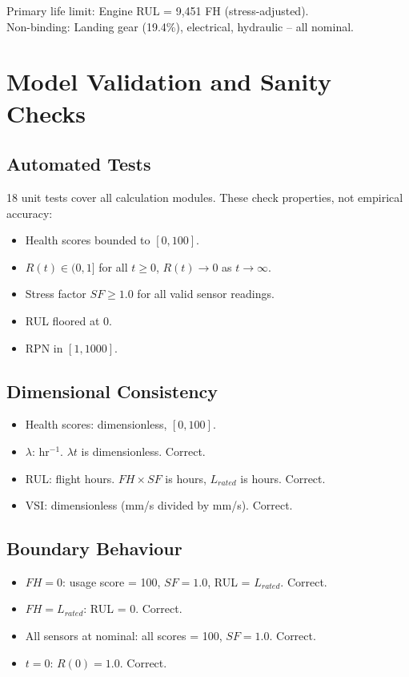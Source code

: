 \documentclass[11pt, a4paper]{report}
\begin{document}
\medskip
\noindent Primary life limit: Engine RUL = 9,451 FH (stress-adjusted). \\
Non-binding: Landing gear (19.4\%), electrical, hydraulic -- all nominal.

\chapter{Model Validation and Sanity Checks}

\section{Automated Tests}

18 unit tests cover all calculation modules. These check properties, not
empirical accuracy:

\begin{itemize}
  \item Health scores bounded to $[0, 100]$.
  \item $R(t) \in (0, 1]$ for all $t \geq 0$, $R(t) \to 0$ as $t \to \infty$.
  \item Stress factor $SF \geq 1.0$ for all valid sensor readings.
  \item RUL floored at 0.
  \item RPN in $[1, 1000]$.
\end{itemize}

\section{Dimensional Consistency}

\begin{itemize}
  \item Health scores: dimensionless, $[0, 100]$.
  \item $\lambda$: hr$^{-1}$. $\lambda t$ is dimensionless. Correct.
  \item RUL: flight hours. $FH \times SF$ is hours, $L_{rated}$ is hours. Correct.
  \item VSI: dimensionless (mm/s divided by mm/s). Correct.
\end{itemize}

\section{Boundary Behaviour}

\begin{itemize}
  \item $FH = 0$: usage score = 100, $SF = 1.0$, RUL = $L_{rated}$. Correct.
  \item $FH = L_{rated}$: RUL = 0. Correct.
  \item All sensors at nominal: all scores = 100, $SF = 1.0$. Correct.
  \item $t = 0$: $R(0) = 1.0$. Correct.
\end{itemize}
\end{document}
